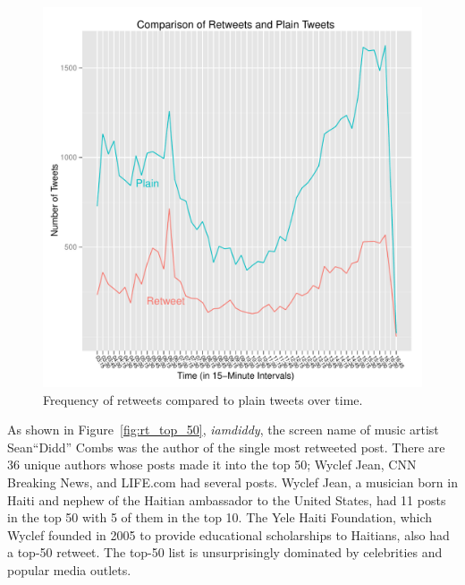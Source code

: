 \documentclass[a4paper, 11pt, titlepage]{article}
\begin{document}
\begin{figure}[h]
\centering
\label{fig:rt_compare_over_time}
\includegraphics[width=120mm]{../figures/rt_compare_over_time}
\caption{Frequency of retweets compared to plain tweets over time.}
\end{figure}

As shown in Figure~\ref{fig:rt_top_50}, \textit{iamdiddy}, the screen name of music artist Sean``Didd'' Combs was the author of the single most retweeted post.  There are 36 unique authors whose posts made it into the top 50; Wyclef Jean, CNN Breaking News, and LIFE.com had several posts.  Wyclef Jean, a musician born in Haiti and nephew of the Haitian ambassador to the United States, had 11 posts in the top 50 with 5 of them in the top 10.  The Yele Haiti Foundation, which Wyclef founded in 2005 to provide educational scholarships to Haitians, also had a top-50 retweet.  The top-50 list is unsurprisingly dominated by celebrities and popular media outlets.
\end{document}
